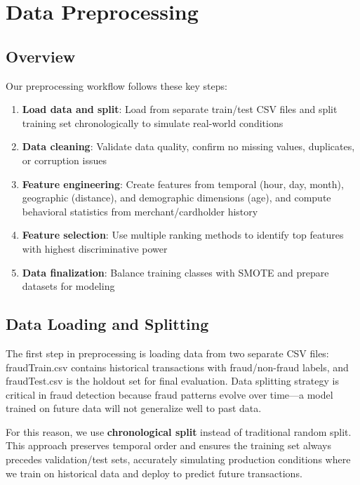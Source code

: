 \newpage
\section{Data Preprocessing}

\subsection{Overview}

Our preprocessing workflow follows these key steps:
\begin{enumerate}
    \item \textbf{Load data and split}: Load from separate train/test CSV files and split training set chronologically to simulate real-world conditions
    \item \textbf{Data cleaning}: Validate data quality, confirm no missing values, duplicates, or corruption issues
    \item \textbf{Feature engineering}: Create features from temporal (hour, day, month), geographic (distance), and demographic dimensions (age), and compute behavioral statistics from merchant/cardholder history
    \item \textbf{Feature selection}: Use multiple ranking methods to identify top features with highest discriminative power
    \item \textbf{Data finalization}: Balance training classes with SMOTE and prepare datasets for modeling
\end{enumerate}

\subsection{Data Loading and Splitting}

The first step in preprocessing is loading data from two separate CSV files: fraudTrain.csv contains historical transactions with fraud/non-fraud labels, and fraudTest.csv is the holdout set for final evaluation. Data splitting strategy is critical in fraud detection because fraud patterns evolve over time---a model trained on future data will not generalize well to past data.

For this reason, we use \textbf{chronological split} instead of traditional random split. This approach preserves temporal order and ensures the training set always precedes validation/test sets, accurately simulating production conditions where we train on historical data and deploy to predict future transactions.

